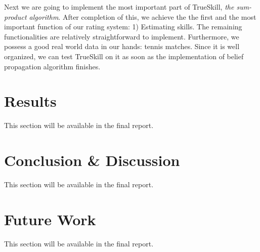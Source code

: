 \documentclass[12pt]{article}
\begin{document}
Next we are going to implement the most important part of TrueSkill, \textit{the sum-product algorithm}. After completion of this, we achieve the the first and the most important function of our rating system: 1) Estimating skills. The remaining functionalities are relatively straightforward to implement. Furthermore, we possess a good real world data in our hands: tennis matches. Since it is well organized, we can test TrueSkill on it as soon as the implementation of belief propagation algorithm finishes.

\section{Results}
This section will be available in the final report.
\section{Conclusion \& Discussion}
This section will be available in the final report.
\section{Future Work}
This section will be available in the final report.



\end{document}
